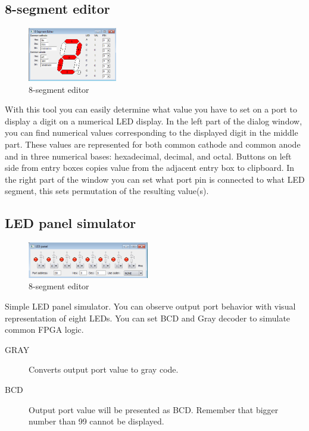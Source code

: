 \subsection{8-segment editor}
    \begin{figure}
        \centering
        \includegraphics[width=110pt]{img/8segment.png}
        \caption{8-segment editor}
    \end{figure}
    With this tool you can easily determine what value you have to set on a port to display a digit on a numerical LED
    display. In the left part of the dialog window, you can find numerical values corresponding to the displayed digit
    in the middle part. These values are represented for both common cathode and common anode and in three numerical
    bases: hexadecimal, decimal, and octal. Buttons on left side from entry boxes copies value from the adjacent entry
    box to clipboard. In the right part of the window you can set what port pin is connected to what LED segment, this
    sets permutation of the resulting value(s).

\subsection{LED panel simulator}
    \begin{figure}
        \centering
        \includegraphics[width=150pt]{img/Led_panel.png}
        \caption{8-segment editor}
    \end{figure}

    Simple LED panel simulator. You can observe output port behavior with visual representation of eight LEDs. You can
    set BCD and Gray decoder to simulate common FPGA logic.

    \begin{description}
        \item[GRAY] Converts output port value to gray code.
        \item[BCD] Output port value will be presented as BCD. Remember that bigger number than 99 cannot be displayed.
    \end{description}

